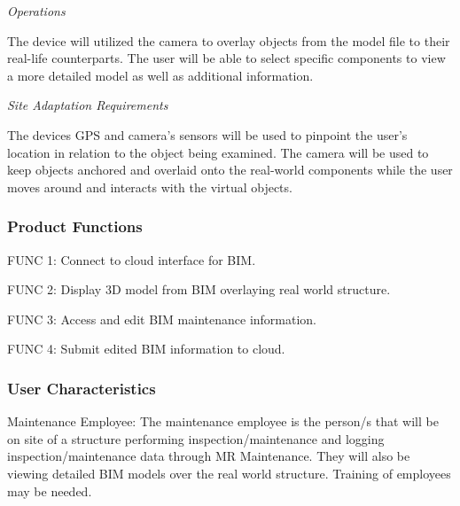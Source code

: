 \documentclass[onecolumn, draftclsnofoot,10pt, compsoc]{IEEEtran}
\begin{document}
            \textit{Operations}\par
            \hangindent=10mm\noindent The device will utilized the camera to overlay objects from the model file to their real-life counterparts. The user will be able to select specific components to view a more detailed model as well as additional information. \par
            \textit{Site Adaptation Requirements}\par
            \hangindent=10mm\noindent The devices GPS and camera's sensors will be used to pinpoint the user's location in relation to the object being examined. The camera will be used to keep objects anchored and overlaid onto the real-world components while the user moves around and interacts with the virtual objects. \par
            
            \subsubsection{Product Functions}
                   \hspace{10mm}FUNC 1: \hspace{10mm}Connect to cloud interface for BIM.\par
                   \hspace{10mm}FUNC 2: \hspace{10mm}Display 3D model from BIM overlaying real world structure.\par
                   \hspace{10mm}FUNC 3: \hspace{10mm}Access and edit BIM maintenance information.\par
                   \hspace{10mm}FUNC 4: \hspace{10mm}Submit edited BIM information to cloud.\par
            
            \subsubsection{User Characteristics}
               \hangindent=10mm\noindent Maintenance Employee: The maintenance employee is the person/s that will be on site of a structure performing inspection/maintenance and logging inspection/maintenance data through MR Maintenance. They will also be viewing detailed BIM models over the real world structure. Training of employees may be needed.\par
            
\end{document}
